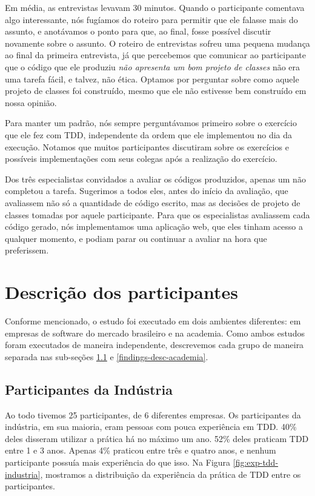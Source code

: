 Em média, as entrevistas levavam 30 minutos. Quando o participante comentava
algo interessante, nós fugíamos do roteiro para permitir que ele falasse mais do assunto,
e anotávamos o ponto para que, ao final, fosse possível discutir novamente sobre o assunto.
O roteiro de entrevistas sofreu uma pequena mudança ao final da primeira entrevista,
já que percebemos que comunicar ao participante que o código que ele produziu
\textit{não apresenta um bom projeto de classes} não era uma tarefa fácil, e talvez, não ética. 
Optamos por perguntar sobre como aquele projeto de classes foi construído, mesmo que ele
não estivesse bem construído em nossa opinião.

Para manter um padrão, nós sempre perguntávamos primeiro sobre o exercício que ele
fez com TDD, independente da ordem que ele implementou no dia da execução. Notamos
que muitos participantes discutiram sobre os exercícios e possíveis implementações com seus colegas
após a realização do exercício.

Dos três especialistas convidados a avaliar os códigos produzidos, apenas um não
completou a tarefa. Sugerimos a todos eles, antes do início da avaliação, que avaliassem
não só a quantidade de código escrito, mas as decisões de projeto de classes tomadas por aquele
participante. Para que os especialistas avaliassem cada código gerado, nós implementamos
uma aplicação web, que eles tinham acesso a qualquer momento, e podiam parar ou continuar
a avaliar na hora que preferissem.


\section{Descrição dos participantes}
\label{sec:desc-participantes}

Conforme mencionado, o estudo foi executado em dois ambientes diferentes: em empresas de software
do mercado brasileiro e na academia. Como ambos estudos foram executados de maneira independente,
descrevemos cada grupo de maneira separada nas sub-seções \ref{findings-desc-industria} e \ref{findings-desc-academia}.

\subsection{Participantes da Indústria}
\label{findings-desc-industria}

Ao todo tivemos 25 participantes, de 6 diferentes empresas.
Os participantes da indústria, em sua maioria, eram pessoas com pouca experiência em TDD.
40\% deles disseram utilizar a prática há no máximo um ano. 52\% deles praticam TDD
entre 1 e 3 anos. Apenas 4\% praticou entre três e quatro anos, e nenhum participante
possuía mais experiência do que isso. Na Figura \ref{fig:exp-tdd-industria}, mostramos
a distribuição da experiência da prática de TDD entre os participantes.

